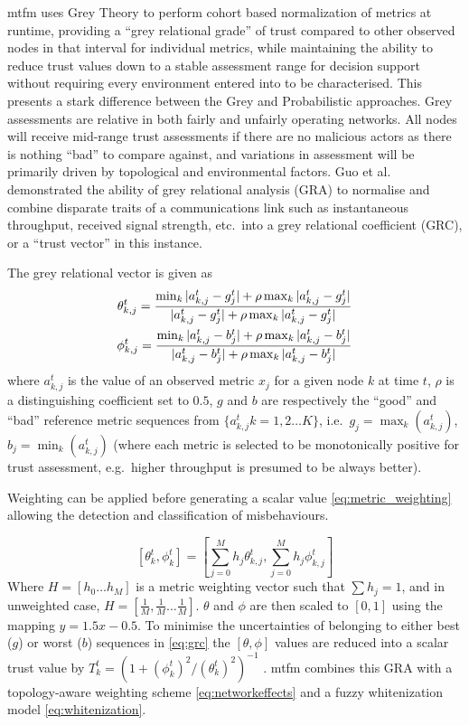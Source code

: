 \gls{mtfm}\cite{Guo11} uses Grey Theory\cite{Zuo1995} to perform cohort based normalization of metrics at runtime, providing a ``grey relational grade'' of trust compared to other observed nodes in that interval for individual metrics, while maintaining the ability to reduce trust values down to a stable assessment range for decision support without requiring every environment entered into to be characterised.
This presents a stark difference between the Grey and Probabilistic approaches.
Grey assessments are relative in both fairly and unfairly operating networks.
All nodes will receive mid-range trust assessments if there are no malicious actors as there is nothing ``bad'' to compare against, and variations in assessment will be primarily driven by topological and environmental factors.
Guo et al.\cite{Guo11} demonstrated the ability of grey relational analysis (GRA) to normalise and combine disparate traits of a communications link such as instantaneous throughput, received signal strength, etc.\ into a grey relational coefficient (GRC), or a ``trust vector'' in this instance.

The grey relational vector is given as
%
\begin{align}
  \label{eq:grc}
  \theta_{k,j}^t = \frac{\min_k|a_{k,j}^t - g_j^t| + \rho \max_k|a_{k,j}^t-g_j^t|}{|a_{k,j}^t-g_j^t| + \rho \max_k|a_{k,j}^t-g_j^t|} \\
  \phi_{k,j}^t = \frac{\min_k|a_{k,j}^t - b_j^t| + \rho \max_k|a_{k,j}^t-b_j^t|}{|a_{k,j}^t-b_j^t| + \rho \max_k|a_{k,j}^t-b_j^t|} \notag 
\end{align}
%
where $a_{k,j}^t$ is the value of an observed metric $x_j$ for a given node $k$ at time $t$, $\rho$ is a distinguishing coefficient set to $0.5$, $g$ and $b$ are respectively the ``good'' and ``bad'' reference metric sequences from $\{a_{k,j}^t k=1,2\dots K\}$, i.e.\ $g_j=\max_k({a_{k,j}^t})$,  $b_j=\min_k({a_{k,j}^t})$ (where each metric is selected to be monotonically positive for trust assessment, e.g.\ higher throughput is presumed to be always better).

Weighting can be applied before generating a scalar value \eqref{eq:metric_weighting} allowing the detection and classification of misbehaviours.

%
\begin{equation}
  \label{eq:metric_weighting}
  [\theta_k^t, \phi_k^t] = \left[\sum_{j=0}^M h_j \theta_{k,j}^t,\sum_{j=0}^M h_j \phi_{k,j}^t \right]
\end{equation}
%
Where $H=[h_0\dots h_M]$ is a metric weighting vector such that $\sum h_j = 1$, and in unweighted case, $H=[\frac{1}{M},\frac{1}{M}\dots\frac{1}{M}]$.
$\theta$ and $\phi$ are then scaled to $[0,1]$ using the mapping $y = 1.5 x - 0.5$.
To minimise the uncertainties of belonging to either best ($g$) or worst ($b$) sequences in \eqref{eq:grc} the $[\theta,\phi]$ values are reduced into a scalar trust value by $T_k^t = ({1+{(\phi_k^t)^2}/{(\theta_k^t)^2}})^{-1}$ \cite{Hong2010}.
\gls{mtfm} combines this GRA with a topology-aware weighting scheme \eqref{eq:networkeffects} and a fuzzy whitenization model \eqref{eq:whitenization}.

